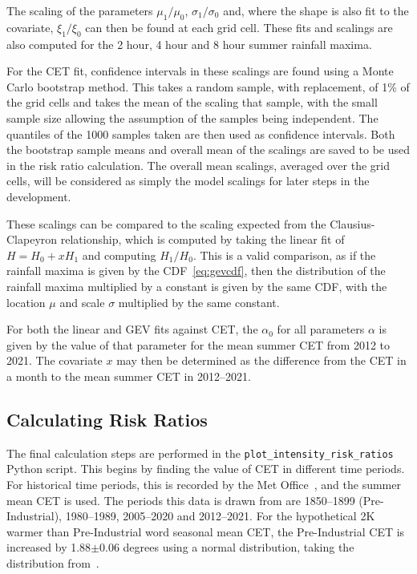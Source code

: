 The scaling of the parameters $\mu_1 / \mu_0$, $\sigma_1 / \sigma_0$ and, where the shape is also fit to the covariate,
    $\xi_1 / \xi_0$ can then be found at each grid cell.
These fits and scalings are also computed for the 2 hour, 4 hour and 8 hour summer rainfall maxima.

For the CET fit,
    confidence intervals in these scalings are found using a Monte Carlo bootstrap method.
This takes a random sample, with replacement, of 1\% of the grid cells and takes the mean of the scaling that sample,
    with the small sample size allowing the assumption of the samples being independent.
The quantiles of the 1000 samples taken are then used as confidence intervals.
Both the bootstrap sample means and overall mean of the scalings are saved to be used in the risk ratio calculation.
The overall mean scalings,
    averaged over the grid cells,
    will be considered as simply the model scalings for later steps in the development.

These scalings can be compared to the scaling expected from the Clausius-Clapeyron relationship,
    which is computed by taking the linear fit of $H = H_0 + xH_1$ and computing $H_1 / H_0$.
This is a valid comparison, as if the rainfall maxima is given by the CDF~\ref{eq:gevcdf},
    then the distribution of the rainfall maxima multiplied by a constant is given by the same CDF,
    with the location $\mu$ and scale $\sigma$ multiplied by the same constant.

For both the linear and GEV fits against CET, the $\alpha_0$ for all parameters $\alpha$ is given by the value of that parameter for
    the mean summer CET from 2012 to 2021.
The covariate $x$ may then be determined as the difference from the CET in a month to the mean summer CET in 2012--2021.

\subsection{Calculating Risk Ratios}\label{subsec:riskratios}

The final calculation steps are performed in the \texttt{plot\_intensity\_risk\_ratios} Python script.
This begins by finding the value of CET in different time periods.
For historical time periods,
    this is recorded by the Met Office~\cite{CET},
    and the summer mean CET is used.
The periods this data is drawn from are 1850--1899 (Pre-Industrial),
    1980--1989, 2005--2020 and 2012--2021.
For the hypothetical 2K warmer than Pre-Industrial word seasonal mean CET,
    the Pre-Industrial CET is increased by 1.88$\pm$0.06 degrees using a normal distribution,
    taking the distribution from~\cite{Tett_Soon}.

